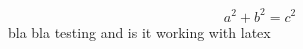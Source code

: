 \documentclass{article}
\begin{document}
\lipsum[1]
\[
    a^2+b^2=c^2    
\]
bla bla testing and is it working with latex
\lipsum[2]
\end{document}
